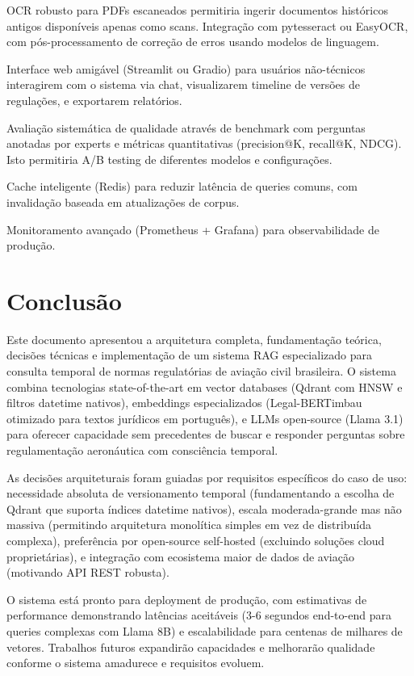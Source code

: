 \documentclass[12pt,a4paper]{article}
\begin{document}
OCR robusto para PDFs escaneados permitiria ingerir documentos históricos antigos disponíveis apenas como scans. Integração com pytesseract ou EasyOCR, com pós-processamento de correção de erros usando modelos de linguagem.

Interface web amigável (Streamlit ou Gradio) para usuários não-técnicos interagirem com o sistema via chat, visualizarem timeline de versões de regulações, e exportarem relatórios.

Avaliação sistemática de qualidade através de benchmark com perguntas anotadas por experts e métricas quantitativas (precision@K, recall@K, NDCG). Isto permitiria A/B testing de diferentes modelos e configurações.

Cache inteligente (Redis) para reduzir latência de queries comuns, com invalidação baseada em atualizações de corpus.

Monitoramento avançado (Prometheus + Grafana) para observabilidade de produção.

\section{Conclusão}

Este documento apresentou a arquitetura completa, fundamentação teórica, decisões técnicas e implementação de um sistema RAG especializado para consulta temporal de normas regulatórias de aviação civil brasileira. O sistema combina tecnologias state-of-the-art em vector databases (Qdrant com HNSW e filtros datetime nativos), embeddings especializados (Legal-BERTimbau otimizado para textos jurídicos em português), e LLMs open-source (Llama 3.1) para oferecer capacidade sem precedentes de buscar e responder perguntas sobre regulamentação aeronáutica com consciência temporal.

As decisões arquiteturais foram guiadas por requisitos específicos do caso de uso: necessidade absoluta de versionamento temporal (fundamentando a escolha de Qdrant que suporta índices datetime nativos), escala moderada-grande mas não massiva (permitindo arquitetura monolítica simples em vez de distribuída complexa), preferência por open-source self-hosted (excluindo soluções cloud proprietárias), e integração com ecosistema maior de dados de aviação (motivando API REST robusta).

O sistema está pronto para deployment de produção, com estimativas de performance demonstrando latências aceitáveis (3-6 segundos end-to-end para queries complexas com Llama 8B) e escalabilidade para centenas de milhares de vetores. Trabalhos futuros expandirão capacidades e melhorarão qualidade conforme o sistema amadurece e requisitos evoluem.
\end{document}
